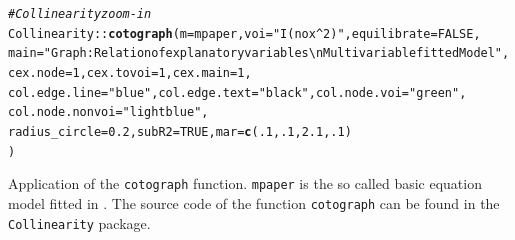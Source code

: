 \documentclass[11pt,a4paper,twoside]{book}\usepackage[]{graphicx}\usepackage[]{xcolor}
\makeatletter
\newcommand{\hlnum}[1]{\textcolor[rgb]{0.686,0.059,0.569}{#1}}%
\newcommand{\hlstr}[1]{\textcolor[rgb]{0.192,0.494,0.8}{#1}}%
\newcommand{\hlcom}[1]{\textcolor[rgb]{0.678,0.584,0.686}{\textit{#1}}}%
\newcommand{\hlopt}[1]{\textcolor[rgb]{0,0,0}{#1}}%
\newcommand{\hlstd}[1]{\textcolor[rgb]{0.345,0.345,0.345}{#1}}%
\newcommand{\hlkwc}[1]{\textcolor[rgb]{0.333,0.667,0.333}{#1}}%
\newcommand{\hlkwd}[1]{\textcolor[rgb]{0.737,0.353,0.396}{\textbf{#1}}}%
\newenvironment{kframe}{%
 \def\at@end@of@kframe{}%
 \ifinner\ifhmode%
  \def\at@end@of@kframe{\end{minipage}}%
  \begin{minipage}{\columnwidth}%
 \fi\fi%
 \def\FrameCommand##1{\hskip\@totalleftmargin \hskip-\fboxsep
 \colorbox{shadecolor}{##1}\hskip-\fboxsep
     \hskip-\linewidth \hskip-\@totalleftmargin \hskip\columnwidth}%
 \MakeFramed {\advance\hsize-\width
   \@totalleftmargin\z@ \linewidth\hsize
   \@setminipage}}%
 {\par\unskip\endMakeFramed%
 \at@end@of@kframe}
\newenvironment{knitrout}{}{} %
\makeatother
\begin{document}
\begin{program}[h!]
\begin{knitrout}
\color{fgcolor}\begin{kframe}
\begin{alltt}
\hlcom{# Collinearity zoom-in}
\hlstd{Collinearity}\hlopt{::}\hlkwd{cotograph}\hlstd{(}\hlkwc{m}\hlstd{=mpaper,}\hlkwc{voi} \hlstd{=} \hlstr{"I(nox^2)"}\hlstd{,} \hlkwc{equilibrate} \hlstd{=} \hlnum{FALSE}\hlstd{,}
   \hlkwc{main} \hlstd{=} \hlstr{"Graph: Relation of explanatory variables\textbackslash{}n Multivariable fitted Model"}\hlstd{,}
   \hlkwc{cex.node} \hlstd{=} \hlnum{1}\hlstd{,} \hlkwc{cex.tovoi} \hlstd{=} \hlnum{1}\hlstd{,} \hlkwc{cex.main} \hlstd{=} \hlnum{1}\hlstd{,}
   \hlkwc{col.edge.line} \hlstd{=} \hlstr{"blue"}\hlstd{,} \hlkwc{col.edge.text} \hlstd{=} \hlstr{"black"}\hlstd{,}\hlkwc{col.node.voi} \hlstd{=} \hlstr{"green"}\hlstd{,}
   \hlkwc{col.node.nonvoi} \hlstd{=} \hlstr{"lightblue"}\hlstd{,}
   \hlkwc{radius_circle} \hlstd{=} \hlnum{0.2}\hlstd{,} \hlkwc{subR2} \hlstd{=} \hlnum{TRUE}\hlstd{,} \hlkwc{mar} \hlstd{=} \hlkwd{c}\hlstd{(}\hlnum{.1}\hlstd{,} \hlnum{.1}\hlstd{,}\hlnum{2.1}\hlstd{,} \hlnum{.1}\hlstd{)}
         \hlstd{)}
\end{alltt}
\end{kframe}
\end{knitrout}
\caption{Application of the \texttt{cotograph} function. \texttt{mpaper} is the so called basic equation model fitted in \cite{Harrison1978}. The source code of the function \texttt{cotograph} can be found in the \texttt{Collinearity} package.}\label{code:zoomin_applied}
\end{program}



\newpage
\end{document}
